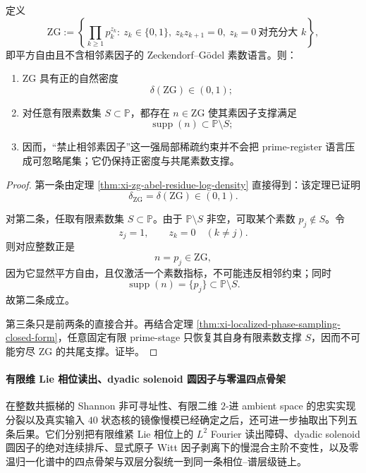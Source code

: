 \begin{theorem}\label{thm:xi-time-part9w-zg-positive-density-cofinal-tail}
定义
\[
\mathrm{ZG}
:=
\left\{
\prod_{k\ge 1}p_k^{z_k}:\ 
z_k\in\{0,1\},\ 
z_kz_{k+1}=0,\ 
z_k=0\ \text{对充分大 }k
\right\},
\]
即平方自由且不含相邻素因子的 Zeckendorf--G\"odel 素数语言。则：
\begin{enumerate}
  \item \(\mathrm{ZG}\) 具有正的自然密度
  \[
  \delta(\mathrm{ZG})\in(0,1);
  \]
  \item 对任意有限素数集 \(S\subset\mathbb P\)，都存在 \(n\in \mathrm{ZG}\) 使其素因子支撑满足
  \[
  \operatorname{supp}(n)\subset \mathbb P\setminus S;
  \]
  \item 因而，“禁止相邻素因子”这一强局部稀疏约束并不会把 prime-register 语言压成可忽略尾集；它仍保持正密度与共尾素数支撑。
\end{enumerate}
\end{theorem}
\begin{proof}
第一条由定理 \ref{thm:xi-zg-abel-residue-log-density} 直接得到：该定理已证明
\[
\delta_{\mathrm{ZG}}=\delta(\mathrm{ZG})\in(0,1).
\]

对第二条，任取有限素数集 \(S\subset\mathbb P\)。由于 \(\mathbb P\setminus S\) 非空，可取某个素数 \(p_j\notin S\)。令
\[
z_j=1,
\qquad
z_k=0\quad (k\neq j).
\]
则对应整数正是
\[
n=p_j\in \mathrm{ZG},
\]
因为它显然平方自由，且仅激活一个素数指标，不可能违反相邻约束；同时
\[
\operatorname{supp}(n)=\{p_j\}\subset \mathbb P\setminus S.
\]
故第二条成立。

第三条只是前两条的直接合并。再结合定理 \ref{thm:xi-localized-phase-sampling-closed-form}，任意固定有限 prime-stage 只恢复其自身有限素数支撑 \(S\)，因而不可能穷尽 \(\mathrm{ZG}\) 的共尾支撑。证毕。
\end{proof}

\paragraph{有限维 Lie 相位读出、dyadic solenoid 圆因子与零温四点骨架}
在整数共振梯的 Shannon 非可寻址性、有限二维 \(2\)-进 ambient space 的忠实实现分裂以及真实输入 \(40\) 状态核的镜像慢模已经确定之后，还可进一步抽取出下列五条后果。它们分别把有限维紧 Lie 相位上的 \(L^2\) Fourier 读出障碍、dyadic solenoid 圆因子的绝对连续排斥、显式原子 Witt 因子剥离下的慢混合主阶不变性，以及零温归一化谱中的四点骨架与双层分裂统一到同一条相位--谱层级链上。

